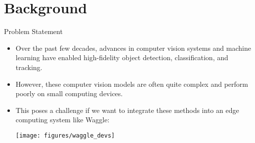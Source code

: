 \documentclass[10pt,handout]{beamer}
\begin{document}
\section{Background}

\begin{frame}{Problem Statement}

\begin{itemize}
\item Over the past few decades, advances in computer vision systems and machine learning have enabled high-fidelity object detection, classification, and tracking.

\item However, these computer vision models are often quite complex and perform poorly on small computing devices.

\pause 
\item This poses a challenge if we want to integrate these methods into an \alert{edge computing} system like Waggle:\\[4mm]
\begin{center}
\texttt{[image: figures/waggle\_devs]}
\end{center}

\end{itemize}
\end{frame}

%
%
%
%
%
%
\end{document}
